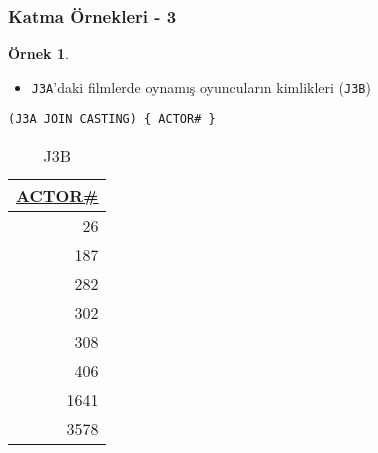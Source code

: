 \documentclass[dvipsnames]{beamer}
\theoremstyle{definition}
\theoremstyle{example}
\newtheorem{ornek}[theorem]{Örnek}
\theoremstyle{plain}
\begin{document}
\begin{frame}[fragile]
  \frametitle{Katma Örnekleri - 3}

  \begin{ornek}
    \begin{itemize}
      \item  \texttt{J3A}'daki filmlerde oynamış oyuncuların kimlikleri
        (\texttt{J3B})
    \end{itemize}

    \begin{lstlisting}
(J3A JOIN CASTING) { ACTOR# }
    \end{lstlisting}

    \pause
    \vspace{-10pt}
    \begin{tiny}
    \begin{table}
      \caption{J3B}
      \begin{tabular}{|r|}\hline
\underline{ACTOR\#}\\[2pt]\hline\hline
                 26\\\hline
                187\\\hline
                282\\\hline
                302\\\hline
                308\\\hline
                406\\\hline
               1641\\\hline
               3578\\\hline
      \end{tabular}
    \end{table}
    \end{tiny}
  \end{ornek}
\end{frame}
\end{document}
